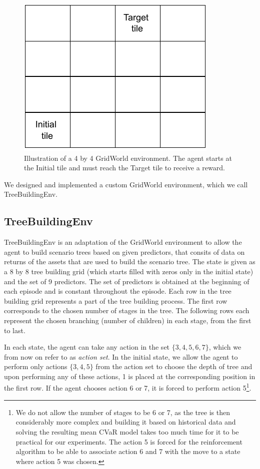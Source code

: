 \begin{figure}[H]
\centering
  \includegraphics[width=\linewidth / 3]{../img/gridworld_env_illustration.pdf}
  \caption{Illustration of a 4 by 4 GridWorld environment. The agent starts at the Initial tile and must reach the Target tile to receive a reward.}
  \label{fig:gridworldenv_illustration}
\end{figure}

We designed and implemented a custom GridWorld environment, which we call TreeBuildingEnv.

\subsection{TreeBuildingEnv}
TreeBuildingEnv is an adaptation of the GridWorld environment to allow the agent to build scenario trees based on given predictors, that consits of data on returns of the assets that are used to build the scenario tree. 
The state is given as a 8 by 8 tree building grid (which starts filled with zeros only in the initial state) and the set of 9 predictors. The set of predictors is obtained at the beginning of each episode and is constant throughout the episode. Each row in the tree building grid represents a part of the tree building process. The first row corresponds to the chosen number of stages in the tree. The following rows each represent the chosen branching (number of children) in each stage, from the first to last.

 In each state, the agent can take any action in the set $\{3,4,5,6,7\}$, which we from now on refer to as \textit{action set}. In the initial state, we allow the agent to perform only actions $\{3,4,5\}$ from the action set to choose the depth of tree and upon performing any of these actions, 1 is placed at the corresponding position in the first row. If the agent chooses action 6 or 7, it is forced to perform action 5\footnote{We do not allow the number of stages to be 6 or 7, as the tree is then considerably more complex and building it based on historical data and solving the resulting mean CVaR model takes too much time for it to be practical for our experiments. The action 5 is forced for the reinforcement algorithm to be able to associate action 6 and 7 with the move to a state where action 5 was chosen.}.


